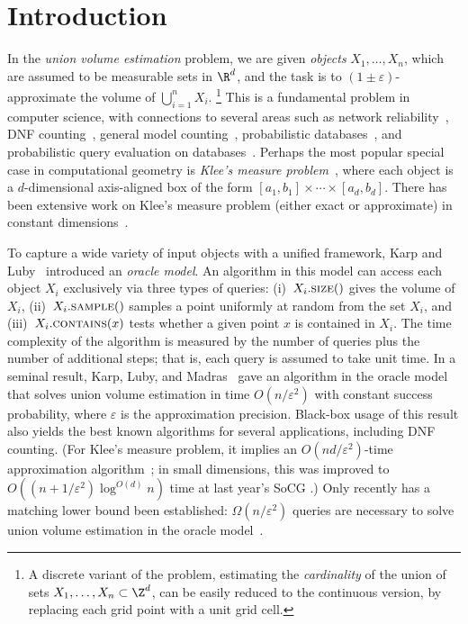 \documentclass[a4paper, 11pt]{article}
\newcommand{\size}{\textsc{size}}
\newcommand{\sample}{\textsc{sample}}
\newcommand{\contains}{\textsc{contains}}
\newcommand{\eps}{\varepsilon}
\begin{document}
\section{Introduction}
In the \emph{union volume estimation} problem, we are given \emph{objects} $X_1,\ldots,X_n$, which are assumed to be measurable sets in $\R^d$, and the task is to $(1\pm\eps)$-approximate the volume of $\bigcup_{i=1}^n X_i$.%
\footnote{A discrete variant of the problem, estimating the \emph{cardinality} of the union of sets $X_1,\ldots,X_n \subset \Z^d$, can be easily reduced to the continuous version, by replacing each grid point with a unit grid cell.}
This is a fundamental problem in computer science, with connections to several areas such as network reliability~\cite{Karger01, KarpLM89}, DNF counting~\cite{KarpLM89}, general model counting~\cite{pavan2023model, chakraborty2013scalable}, probabilistic databases~\cite{kimelfeld2008query, DalviS07, re2006efficient}, and probabilistic query evaluation on databases~\cite{carmeli2020answering, carmeli2023tractable}.
Perhaps the most popular special case in computational geometry is 
\emph{Klee's measure problem}~\cite{Klee77}, where each object is a $d$-dimensional axis-aligned box of the form $[a_1, b_1] \times \cdots \times [a_d, b_d]$. There has been extensive work on Klee's measure problem (either exact or approximate) in constant dimensions~\cite{OY91,Chan10,Chan13,Kunnemann22,GorbachevK23,BLNRW25}.

To capture a wide variety of input objects with a unified framework, Karp and Luby~\cite{KarpL85} introduced an \emph{oracle model}. An algorithm in this model can access each object $X_i$ exclusively via three types of queries: (i)~$X_i.\size()$ gives the volume of $X_i$, (ii)~$X_i.\sample()$ samples a point uniformly at random from the set $X_i$, and (iii)~$X_i.\contains(x)$ tests whether a given point $x$ is contained in $X_i$. The time complexity of the algorithm is measured by the number of queries plus the number of additional steps; that is, each query is assumed to take unit time. In a seminal result, Karp, Luby, and Madras~\cite{KarpLM89} gave an algorithm in the oracle model that solves union volume estimation in time $O(n/\eps^2)$ with constant success probability, where $\eps$ is the approximation precision. Black-box usage of this result also yields the best known algorithms for several applications, including DNF counting. (For Klee's measure problem, it implies an $O(nd / \eps^2)$-time approximation algorithm~\cite{BringmannF10}; in small dimensions, this was improved to $O((n+ 1/\eps^2)\log^{O(d)}n)$ time at last year's SoCG \cite{BLNRW25}.) Only recently has a matching lower bound been established: $\Omega(n/\eps^2)$ queries are necessary to solve union volume estimation in the oracle model~\cite{BLNRW25}.
\end{document}
